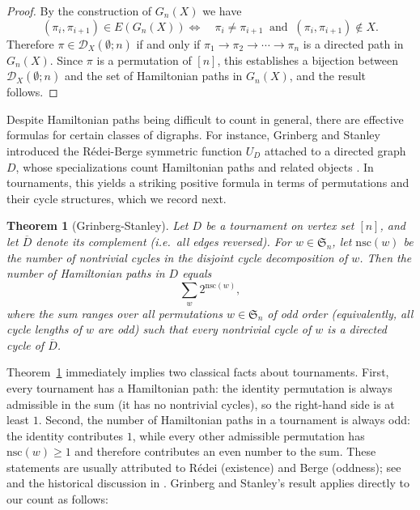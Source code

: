 \documentclass[12pt]{amsart}
\newtheorem{theorem}{Theorem}[section]
\theoremstyle{definition}
\theoremstyle{remark}
\newcommand{\Sset}{\mathfrak{S}}
\begin{document}
\begin{proof}
By the construction of \(G_n(X)\) we have
\[
 (\pi_i,\pi_{i+1})\in E(G_n(X))
 \Longleftrightarrow\quad
 \pi_i\neq \pi_{i+1}\ \text{ and }\ (\pi_i,\pi_{i+1})\notin X.
\]
Therefore \(\pi\in\mathcal{D}_X(\emptyset;n)\) if and only if
\(\pi_1\to\pi_2\to\cdots\to\pi_n\) is a directed path in \(G_n(X)\). Since $\pi$ is a permutation of $[n]$, this establishes a bijection between \(\mathcal{D}_X(\emptyset;n)\) and the set of Hamiltonian paths in \(G_n(X)\), and the result follows.
\end{proof}


\medskip


Despite Hamiltonian paths being difficult to count in general, there are effective formulas for certain classes of digraphs. For instance, Grinberg and Stanley introduced the R\'edei-Berge symmetric function $U_D$ attached to a directed graph $D$, whose specializations count Hamiltonian paths and related objects \cite{grinberg-stanley-redei-berge}.
In tournaments, this yields a striking positive formula in terms of permutations and their cycle structures, which we
record next.


\begin{theorem}[Grinberg-Stanley]\label{thm:tournament}
Let $D$ be a tournament on vertex set $[n]$, and let $\overline{D}$ denote its complement (i.e.\ all edges reversed).
For $w\in\Sset_n$, let $\mathrm{nsc}(w)$ be the number of nontrivial cycles in the disjoint cycle decomposition of $w$.
Then the number of Hamiltonian paths in $D$ equals
\[
\sum_{w} 2^{\mathrm{nsc}(w)},
\]
where the sum ranges over all permutations $w\in\Sset_n$ of odd order (equivalently, all cycle lengths of $w$ are odd)
such that every nontrivial cycle of $w$ is a directed cycle of $\overline{D}$.
\end{theorem}
Theorem~\ref{thm:tournament} immediately implies two classical facts about tournaments.
First, every tournament has a Hamiltonian path: the identity permutation is always admissible in the sum (it has no
nontrivial cycles), so the right-hand side is at least $1$.
Second, the number of Hamiltonian paths in a tournament is always odd: the identity contributes $1$, while every other
admissible permutation has $\mathrm{nsc}(w)\ge 1$ and therefore contributes an even number to the sum.
These statements are usually attributed to R\'edei (existence) and Berge (oddness); see \cite{moon-tournaments} and the
historical discussion in \cite{grinberg-stanley-redei-berge}. Grinberg and Stanley's result applies directly to our count as follows:
\end{document}

